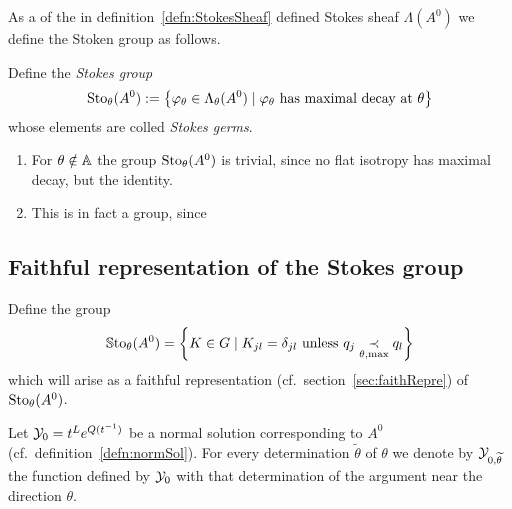 \begin{comment}
  In the case with only one level, the stokes directions are rotational
  symetric.
  \\The stokes direction, beared by level $k$ have the rotational symmetry.
\end{comment}

As a  of the in
definition~\ref{defn:StokesSheaf} defined Stokes sheaf $\Lambda(A^0)$ we
define the Stoken group as follows.
\begin{defn}
  Define the \emph{Stokes group}
  \[
    \operatorname{Sto}_\theta(A^0):=
    \left\{\varphi_\theta\in\Lambda_\theta(A^0)
      \mid \varphi_\theta \text{ has maximal decay at } \theta
    \right\}
  \]
  whose elements are colled \emph{Stokes germs}.
  \begin{s-rem}
    \begin{enumerate}
      \item For $\theta\notin\mathbb{A}$ the group $\operatorname{Sto}_\theta(A^0)$ is trivial, since
        no flat isotropy has maximal decay, but the identity.
      \item This is in fact a group, since \TODO{}
    \end{enumerate}
  \end{s-rem}
\end{defn}

\subsection{Faithful representation of the Stokes group}\label{sec:matrixReps}
\begin{comment}
  See \cite[9f]{thboalch} and \cite[??]{Loday1994}
\end{comment}
\begin{defn}\label{defn:groupOfFaithfullReps}
  Define the group
  \[
    \operatorname{\mathbb{S}to}_\theta(A^0)= \left\{K\in G\mid K_{jl}=\delta_{jl} \text{ unless }
      q_j \underset{\theta,\max}{\prec} q_l \right\}
  \]
  which will arise as a faithful representation (cf.\
  section~\ref{sec:faithRepre}) of $\operatorname{Sto}_\theta(A^0)$.
\end{defn}
Let $\mathcal{Y}_0=t^L e^{Q(t^{-1})}$ be a normal solution corresponding to
$A^0$ (cf.\ definition~\ref{defn:normSol}).
For every determination $\tilde\theta$ of $\theta$ we denote by
$\mathcal{Y}_{0,\widetilde\theta}$ the function defined by $\mathcal{Y}_0$ with that determination of
the argument near the direction $\theta$.\label{page:alreadyUsedDefn}

